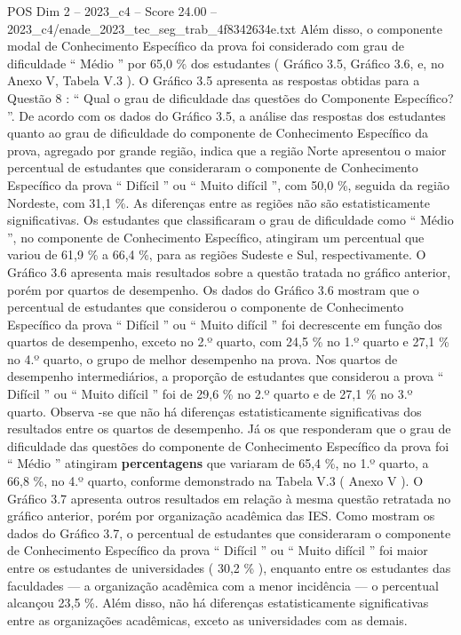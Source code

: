 \begin{textsample}{POS Dim 2 – 2023\_c4 – Score 24.00 – 2023\_c4/enade\_2023\_tec\_seg\_trab\_4f8342634e.txt}
Além disso, o componente modal de Conhecimento Específico da prova foi considerado com grau de dificuldade “ Médio ” por 65,0 \% dos estudantes ( Gráfico 3.5, Gráfico 3.6, e, no Anexo V, Tabela V.3 ).
O Gráfico 3.5 apresenta as respostas obtidas para a Questão 8 : “ Qual o grau de dificuldade das questões do Componente Específico? ”.
De acordo com os dados do Gráfico 3.5, a análise das respostas dos estudantes quanto ao grau de dificuldade do componente de Conhecimento Específico da prova, agregado por grande região, indica que a região Norte apresentou o maior percentual de estudantes que consideraram o componente de Conhecimento Específico da prova “ Difícil ” ou “ Muito difícil ”, com 50,0 \%, seguida da região Nordeste, com 31,1 \%.
As diferenças entre as regiões não são estatisticamente significativas.
Os estudantes que classificaram o grau de dificuldade como “ Médio ”, no componente de Conhecimento Específico, atingiram um percentual que variou de 61,9 \% a 66,4 \%, para as regiões Sudeste e Sul, respectivamente.
O Gráfico 3.6 apresenta mais resultados sobre a questão tratada no gráfico anterior, porém por quartos de desempenho.
Os dados do Gráfico 3.6 mostram que o percentual de estudantes que considerou o componente de Conhecimento Específico da prova “ Difícil ” ou “ Muito difícil ” foi decrescente em função dos quartos de desempenho, exceto no 2.º quarto, com 24,5 \% no 1.º quarto e 27,1 \% no 4.º quarto, o grupo de melhor desempenho na prova.
Nos quartos de desempenho intermediários, a proporção de estudantes que considerou a prova “ Difícil ” ou “ Muito difícil ” foi de 29,6 \% no 2.º quarto e de 27,1 \% no 3.º quarto.
Observa -se que não há diferenças estatisticamente significativas dos resultados entre os quartos de desempenho.
Já os que responderam que o grau de dificuldade das questões do componente de Conhecimento Específico da prova foi “ Médio ” atingiram \textbf{percentagens} que variaram de 65,4 \%, no 1.º quarto, a 66,8 \%, no 4.º quarto, conforme demonstrado na Tabela V.3 ( Anexo V ).
O Gráfico 3.7 apresenta outros resultados em relação à mesma questão retratada no gráfico anterior, porém por organização acadêmica das IES.
Como mostram os dados do Gráfico 3.7, o percentual de estudantes que consideraram o componente de Conhecimento Específico da prova “ Difícil ” ou “ Muito difícil ” foi maior entre os estudantes de universidades ( 30,2 \% ), enquanto entre os estudantes das faculdades — a organização acadêmica com a menor incidência — o percentual alcançou 23,5 \%.
Além disso, não há diferenças estatisticamente significativas entre as organizações acadêmicas, exceto as universidades com as demais.

\end{textsample}
